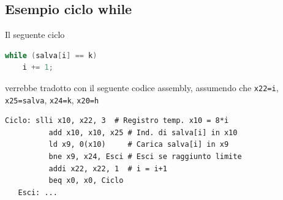 \subsection{Esempio ciclo while}
Il seguente ciclo
\begin{center}
	\begin{lstlisting}[language=c, frame = none]
  while (salva[i] == k)
    i += 1;
\end{lstlisting}
\end{center}
verrebbe tradotto con il seguente codice assembly, assumendo che \verb|x22=i|, \verb|x25=salva|, \verb|x24=k|, \verb|x20=h|
\begin{lstlisting}[language=assembly]
   Ciclo: slli x10, x22, 3  # Registro temp. x10 = 8*i
          add x10, x10, x25 # Ind. di salva[i] in x10
          ld x9, 0(x10)     # Carica salva[i] in x9
          bne x9, x24, Esci # Esci se raggiunto limite
          addi x22, x22, 1  # i = i+1
          beq x0, x0, Ciclo
   Esci: ...
\end{lstlisting}

